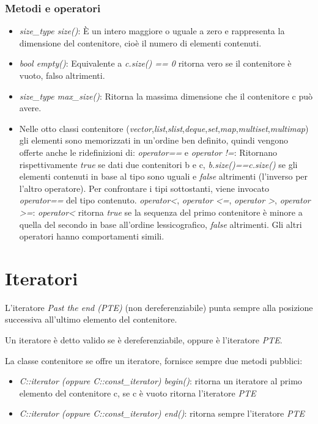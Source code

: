 \subsubsection{Metodi e operatori}
\begin{itemize}
	\item \textit{size\_type size()}: \`{E} un intero maggiore o uguale a zero e rappresenta la dimensione del contenitore, cioè il numero di elementi contenuti.
	\item \textit{bool empty()}: Equivalente a \textit{c.size() == 0} ritorna vero se il contenitore è vuoto, falso altrimenti.
	\item \textit{size\_type max\_size()}: Ritorna la massima dimensione che il contenitore c può avere.
	\item Nelle otto classi contenitore (\textit{vector},\textit{list},\textit{slist},\textit{deque},\textit{set},\textit{map},\textit{multiset},\textit{multimap}) gli elementi sono memorizzati in un'ordine ben definito, quindi vengono offerte anche le ridefinizioni di:
	\subitem \textit{operator==} e \textit{operator !=}: Ritornano rispettivamente \textit{true} se dati due contenitori b e c, \textit{b.size()==c.size()} se gli elementi contenuti in base al tipo sono uguali e \textit{false} altrimenti (l'inverso per l'altro operatore). Per confrontare i tipi sottostanti, viene invocato \textit{operator==} del tipo contenuto.
	\subitem \textit{operator<}, \textit{operator <=}, \textit{operator >}, \textit{operator >=}: \textit{operator<} ritorna \textit{true} se la sequenza del primo contenitore è minore a quella del secondo in base all'ordine lessicografico, \textit{false} altrimenti. Gli altri operatori hanno comportamenti simili. 
\end{itemize}

\section{Iteratori}
L'iteratore \textit{Past the end (PTE)} (non dereferenziabile) punta sempre alla posizione successiva all'ultimo elemento del contenitore.

Un iteratore è detto valido se è dereferenziabile, oppure è l'iteratore \textit{PTE}.

La classe contenitore se offre un iteratore, fornisce sempre due metodi pubblici:

\begin{itemize}
	\item \textit{C::iterator (oppure C::const\_iterator) begin()}: ritorna un iteratore al primo elemento del contenitore c, se c è vuoto ritorna l'iteratore \textit{PTE} 
	\item \textit{C::iterator (oppure C::const\_iterator) end()}: ritorna sempre l'iteratore \textit{PTE}
\end{itemize}

